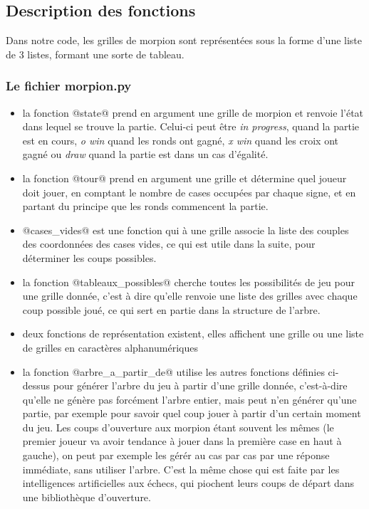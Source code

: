 \documentclass{article}
\begin{document}
\subsection{Description des fonctions}

Dans notre code, les grilles de morpion sont représentées sous la forme d'une liste de 3 listes, formant une sorte de tableau.

\subsubsection{Le fichier morpion.py}
\begin{itemize}

\item la fonction @state@ prend en argument une grille de morpion et renvoie l'état dans lequel se trouve la partie. Celui-ci peut être \emph{in progress}, quand la partie est en cours, \emph{o win} quand les ronds ont gagné, \emph{x win} quand les croix ont gagné ou \emph{draw} quand la partie est dans un cas d'égalité. \\

\item la fonction @tour@ prend en argument une grille et détermine quel joueur doit jouer, en comptant le nombre de cases occupées par chaque signe, et en partant du principe que les ronds commencent la partie. \\

\item @cases_vides@ est une fonction qui à une grille associe la liste des couples des coordonnées des cases vides, ce qui est utile dans la suite, pour déterminer les coups possibles. \\

\item la fonction @tableaux_possibles@ cherche toutes les possibilités de jeu pour une grille donnée, c'est à dire qu'elle renvoie une liste des grilles avec chaque coup possible joué, ce qui sert en partie dans la structure de l'arbre. \\

\item deux fonctions de représentation existent, elles affichent une grille ou une liste de grilles en caractères alphanumériques \\

\item la fonction @arbre_a_partir_de@ utilise les autres fonctions définies ci-dessus pour générer l'arbre du jeu à partir d'une grille donnée, c'est-à-dire qu'elle ne génère pas forcément l'arbre entier, mais peut n'en générer qu'une partie, par exemple pour savoir quel coup jouer à partir d'un certain moment du jeu. Les coups d'ouverture aux morpion étant souvent les mêmes (le premier joueur va avoir tendance à jouer dans la première case en haut à gauche), on peut par exemple les gérér au cas par cas par une réponse immédiate, sans utiliser l'arbre. C'est la même chose qui est faite par les intelligences artificielles aux échecs, qui piochent leurs coups de départ dans une bibliothèque d'ouverture.

\end{itemize}
\end{document}
